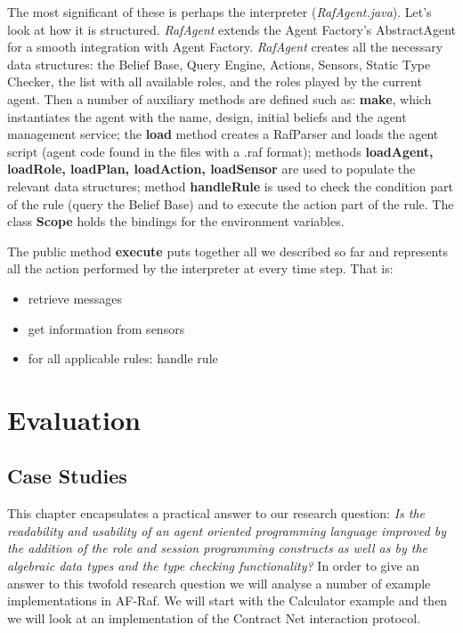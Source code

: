 \documentclass[a4paper,12pt,oneside,fleqn]{book} %
\newcommand{\todo}[1]{[\textcolor{red}{TODO}: #1]}
\begin{document}
{The most significant of these is perhaps the interpreter
(\textit{RafAgent.java}). Let's look at how it is structured.
\textit{RafAgent} extends the Agent Factory's AbstractAgent for a smooth
integration with Agent Factory. \textit{RafAgent} creates all the necessary
data structures: the Belief Base, Query Engine, Actions, Sensors, Static
Type Checker, the list with all available roles, and the roles played by the
current agent. Then a number of auxiliary methods are defined such as:
\textbf{make}, which instantiates the agent with the
name, design, initial beliefs and the agent management service; the
\textbf{load} method creates a RafParser and loads the agent script (agent
code found in the files with a .raf format); methods \textbf{loadAgent,
loadRole, loadPlan, loadAction, loadSensor} are used to populate the
relevant data structures; method \textbf{handleRule} is used to check the
condition part of the rule (query the Belief Base) and to execute the
action part of the rule. The class \textbf{Scope} holds the bindings for
the environment variables. 

The public method \textbf{execute} puts together all we
described so far and represents all the action performed by the interpreter
at every time step. That is:

\begin{itemize}
    \item retrieve messages
    \item get information from sensors
    \item for all applicable rules: handle rule
\end{itemize}


\part{Evaluation}\label{part:eval} %

\chapter{Case Studies}\label{ch:casestudy} %


This chapter encapsulates a practical answer to our research question:
\textit{Is the readability and usability of an agent oriented programming
  language improved by the addition of the role and session programming
  constructs as well as by the algebraic data types and the type checking
functionality?} In order to give an answer to this twofold research
question we will analyse a number of example implementations in AF-Raf. We
will start with the Calculator example and then we will look at an
implementation of the Contract Net interaction protocol.

}
\end{document}
